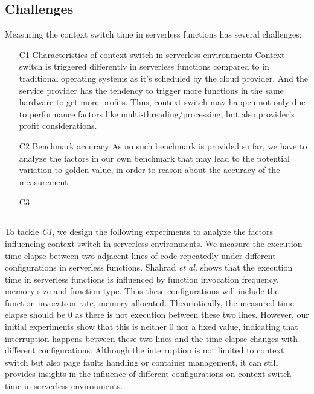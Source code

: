 


\subsection{Challenges}
Measuring the context switch time in serverless functions has several challenges:
\begin{itemize}
	\item [C1] Characteristics of context switch in serverless environments
	Context switch is triggered differently in serverless functions compared to in traditional operating systems as it's scheduled by the cloud provider.
	And the service provider has the tendency to trigger more functions in the same hardware to get more profits. 
	Thus, context switch may happen not only due to performance factors like multi-threading/processing, but also provider's profit considerations.
	\item [C2] Benchmark accuracy
	As no such benchmark is provided so far, we have to analyze the factors in our own benchmark that may lead to the potential variation to golden value, 
	in order to reason about the accuracy of the measurement.
	\item [C3] 
\end{itemize}

\subsection{}
	To tackle \emph{C1}, we design the following experiments to analyze the factors influencing context switch in serverless environments.
	We measure the execution time elapse between two adjacent lines of code repeatedly under different configurations in serverless functions.
	Shahrad \emph{et al.} \cite{serverless-main} shows that the execution time in serverless functions is influenced by function invocation frequency, memory size and function type.
	Thus these configurations will include the function invocation rate, memory allocated.
	Theoriotically, the measured time elapse should be 0 as there is not execution between these two lines. 
	However, our initial experiments show that this is neither 0 nor a fixed value, indicating that interruption happens between these two lines
	and the time elapse changes with different configurations. 
	Although the interruption is not limited to context switch but also page faults handling or container management, 
	it can still provides insights in the influence of different configurations on context switch time in serverless environments.



